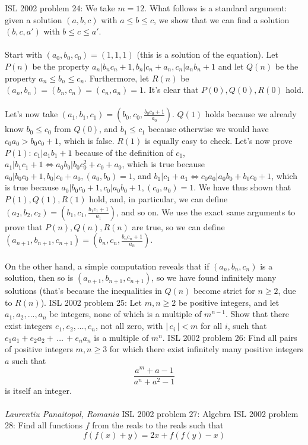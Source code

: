 ISL 2002 problem 24:  We take $m=12$. What follows is a standard argument: given a solution $(a,b,c)$ with $a\le b\le c$, we show that we can find a solution $(b,c,a')$ with $b\le c\le a'$. \\\\
Start with $(a_0,b_0,c_0)=(1,1,1)$ (this is a solution of the equation). Let $P(n)$ be the property $a_n|b_nc_n+1, b_n|c_n+a_n, c_n|a_nb_n+1$ and let $Q(n)$ be the property $a_n\le b_n\le c_n$. Furthermore, let $R(n)$ be $(a_n,b_n)=(b_n,c_n)=(c_n,a_n)=1$. It’s clear that $P(0),Q(0),R(0)$ hold. \\\\
Let’s now take $(a_1,b_1,c_1)=(b_0,c_0,\frac{b_0c_0+1}{a_0})$. $Q(1)$ holds because we already know $b_0\le c_0$ from $Q(0)$, and $b_1\le c_1$ because otherwise we would have $c_0a_0>b_0c_0+1$, which is false. $R(1)$ is equally easy to check. Let’s now prove $P(1)$: $c_1|a_1b_1+1$ because of the definition of $c_1$, $a_1|b_1c_1+1\iff a_0b_0|b_0c_0^2+c_0+a_0$, which is true because $a_0|b_0c_0+1,b_0|c_0+a_0,(a_0,b_0)=1$, and $b_1|c_1+a_1\iff c_0a_0|a_0b_0+b_0c_0+1$, which is true because $a_0|b_0c_0+1,c_0|a_0b_0+1,(c_0,a_0)=1$. We have thus shown that $P(1),Q(1),R(1)$ hold, and, in particular, we can define $(a_2,b_2,c_2)=(b_1,c_1,\frac{b_1c_1+1}{a_1})$, and so on. We use the exact same arguments to prove that $P(n),Q(n),R(n)$ are true, so we can define $(a_{n+1},b_{n+1},c_{n+1})=(b_n,c_n,\frac{b_nc_n+1}{a_n})$. \\\\
On the other hand, a simple computation reveals that if $(a_n,b_n,c_n)$ is a solution, then so is $(a_{n+1},b_{n+1},c_{n+1})$, so we have found infinitely many solutions (that’s because the inequalities in $Q(n)$ become strict for $n\ge 2$, due to $R(n)$). 
ISL 2002 problem 25:  Let $m,n\geq2$ be positive integers, and let $a_1,a_2,\ldots ,a_n$ be integers, none of which is a multiple of $m^{n-1}$.  Show that there exist integers $e_1,e_2,\ldots,e_n$, not all zero, with $\left|{\,e}_i\,\right|<m$ for all $i$, such that $e_1a_1+e_2a_2+\,\ldots\,+e_na_n$ is a multiple of $m^n$. 
ISL 2002 problem 26:  Find all pairs of positive integers $m,n\geq3$ for which there exist infinitely many positive integers $a$ such that
\[ \frac{a^m+a-1}{a^n+a^2-1} \]
is itself an integer. \\\\
\textit{Laurentiu Panaitopol, Romania} 
ISL 2002 problem 27:  Algebra 
ISL 2002 problem 28:  Find all functions $f$ from the reals to the reals such that
\[ f\left(f(x)+y\right)=2x+f\left(f(y)-x\right) \]
